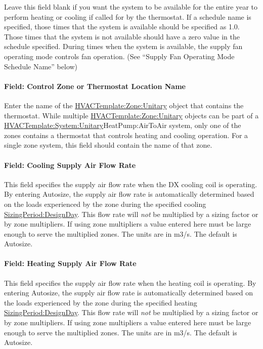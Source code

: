 Leave this field blank if you want the system to be available for the entire year to perform heating or cooling if called for by the thermostat. If a schedule name is specified, those times that the system is available should be specified as 1.0. Those times that the system is not available should have a zero value in the schedule specified. During times when the system is available, the supply fan operating mode controls fan operation. (See ``Supply Fan Operating Mode Schedule Name'' below)

\paragraph{Field: Control Zone or Thermostat Location Name}\label{field-control-zone-or-thermostat-location-name-1}

Enter the name of the \hyperref[hvactemplatezoneunitary]{HVACTemplate:Zone:Unitary} object that contains the thermostat. While multiple \hyperref[hvactemplatezoneunitary]{HVACTemplate:Zone:Unitary} objects can be part of a \hyperref[hvactemplatesystemunitary]{HVACTemplate:System:Unitary}HeatPump:AirToAir system, only one of the zones contains a thermostat that controls heating and cooling operation. For a single zone system, this field should contain the name of that zone.

\paragraph{Field: Cooling Supply Air Flow Rate}\label{field-cooling-supply-air-flow-rate-4}

This field specifies the supply air flow rate when the DX cooling coil is operating. By entering Autosize, the supply air flow rate is automatically determined based on the loads experienced by the zone during the specified cooling \hyperref[sizingperioddesignday]{SizingPeriod:DesignDay}. This flow rate will \emph{not} be multiplied by a sizing factor or by zone multipliers. If using zone multipliers a value entered here must be large enough to serve the multiplied zones. The units are in m3/s. The default is Autosize.

\paragraph{Field: Heating Supply Air Flow Rate}\label{field-heating-supply-air-flow-rate-4}

This field specifies the supply air flow rate when the heating coil is operating. By entering Autosize, the supply air flow rate is automatically determined based on the loads experienced by the zone during the specified heating \hyperref[sizingperioddesignday]{SizingPeriod:DesignDay}. This flow rate will \emph{not} be multiplied by a sizing factor or by zone multipliers. If using zone multipliers a value entered here must be large enough to serve the multiplied zones. The units are in m3/s. The default is Autosize.

